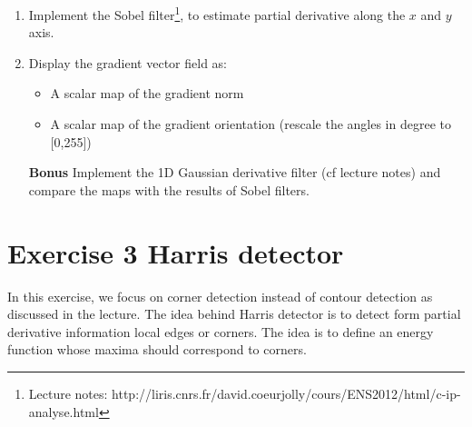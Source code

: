 \documentclass[a4paper, 11pt, french]{article}
\begin{document}
\begin{enumerate}
	\item Implement the Sobel filter\footnote{Lecture notes: http://liris.cnrs.fr/david.coeurjolly/cours/ENS2012/html/c-ip-analyse.html}, to estimate partial derivative along the $x$ and $y$ axis.
	\item Display the gradient vector field as:
	\begin{itemize}
		\item A scalar map of the gradient norm 
		\item A scalar map of the gradient orientation (rescale the angles in degree to [0,255])
	\end{itemize}
	
	\item[\textbf{Bonus}] Implement the 1D Gaussian derivative filter (cf lecture notes) and compare the maps with the results of Sobel filters. 
\end{enumerate}


\section*{Exercise 3 \rm Harris detector}

\par In this exercise, we focus on corner detection instead of contour detection as discussed in the lecture. 
The idea behind Harris detector is to detect form partial derivative information local edges or corners. The idea is to define an energy function whose maxima should correspond to corners.
\end{document}
